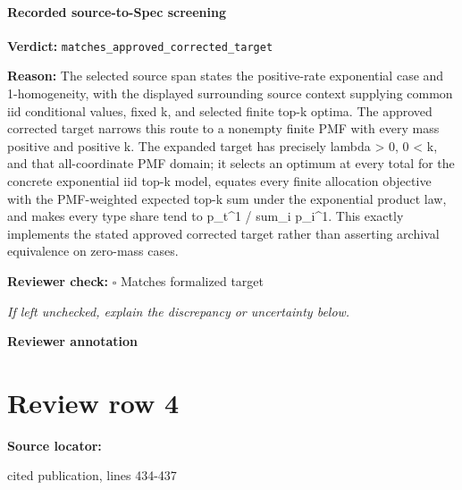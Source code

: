 \documentclass[10pt]{article}
\newcommand{\reviewerbox}{%
  \par\noindent\fbox{\parbox{0.96\linewidth}{\rule{0pt}{0.38in}}}\par
}
\newcommand{\reviewmatch}[1]{%
  \par\noindent\textbf{Reviewer check:} $\square$\; #1\par
  \noindent\emph{If left unchecked, explain the discrepancy or uncertainty below.}\par
}
\begin{document}
\paragraph{Recorded source-to-Spec screening}
\textbf{Verdict:} \texttt{matches\_approved\_corrected\_target}
\\
{\raggedright
\textbf{Reason:} The selected source span states the positive-\allowbreak{}rate exponential case and 1-\allowbreak{}homogeneity, with the displayed surrounding source context supplying common iid conditional values, fixed k, and selected finite top-\allowbreak{}k optima.\allowbreak{} The approved corrected target narrows this route to a nonempty finite PMF with every mass positive and positive k.\allowbreak{} The expanded target has precisely lambda > 0, 0 < k, and that all-\allowbreak{}coordinate PMF domain;\allowbreak{} it selects an optimum at every total for the concrete exponential iid top-\allowbreak{}k model, equates every finite allocation objective with the PMF-\allowbreak{}weighted expected top-\allowbreak{}k sum under the exponential product law, and makes every type share tend to p\_\allowbreak{}t\textasciicircum{}1 /\allowbreak{} sum\_\allowbreak{}i p\_\allowbreak{}i\textasciicircum{}1.\allowbreak{} This exactly implements the stated approved corrected target rather than asserting archival equivalence on zero-\allowbreak{}mass cases.\allowbreak{}
\par}
\reviewmatch{Matches formalized target}
\noindent\textbf{Reviewer annotation}\par
\reviewerbox
\clearpage
\hypertarget{source-claim-cc5ff6e8390a6049}{}
\section*{Review row 4}
\textbf{Source locator:} {\footnotesize\raggedright cited publication, lines 434-\allowbreak{}437\par}
\end{document}

